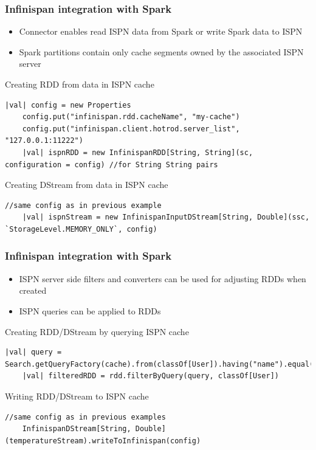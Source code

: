 \documentclass[10pt,utf8]{beamer}
\begin{document}
\begin{frame}[fragile]
	\frametitle{Infinispan integration with Spark}
	\begin{itemize}
		\item Connector enables read ISPN data from Spark or write Spark data to ISPN
		\item Spark partitions contain only cache segments owned by the associated ISPN server
	\end{itemize}
	\vspace{0.3cm}
	Creating RDD from data in ISPN cache
	\begin{lstlisting}[style=Java]
    |val| config = new Properties
    config.put("infinispan.rdd.cacheName", "my-cache")
    config.put("infinispan.client.hotrod.server_list", "127.0.0.1:11222")
    |val| ispnRDD = new InfinispanRDD[String, String](sc, configuration = config) //for String String pairs
	\end{lstlisting}
	\vspace{0.3cm}
	Creating DStream from data in ISPN cache
	\begin{lstlisting}[style=Java]
    //same config as in previous example
    |val| ispnStream = new InfinispanInputDStream[String, Double](ssc, `StorageLevel.MEMORY_ONLY`, config)
	\end{lstlisting}
\end{frame}

\begin{frame}[fragile]
	\frametitle{Infinispan integration with Spark}
	\begin{itemize}
	 \item ISPN server side filters and converters can be used for adjusting RDDs when created 
	 \item ISPN queries can be applied to RDDs
	\end{itemize}
	\vspace{0.5cm}
	Creating RDD/DStream by querying ISPN cache
	\begin{lstlisting}[style=Java]
    |val| query = Search.getQueryFactory(cache).from(classOf[User]).having("name").equal("Vojtech").toBuilder[RemoteQuery].build
    |val| filteredRDD = rdd.filterByQuery(query, classOf[User])
	\end{lstlisting}
	\vspace{0.5cm}
	Writing RDD/DStream to ISPN cache
		\begin{lstlisting}[style=Java]
    //same config as in previous examples
    InfinispanDStream[String, Double](temperatureStream).writeToInfinispan(config)
	\end{lstlisting}
\end{frame}
\end{document}
